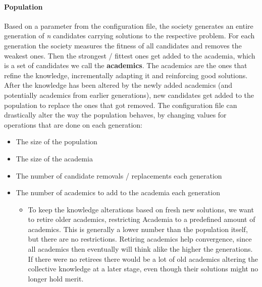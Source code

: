 \documentclass[a4paper,english]{report}
\begin{document}
		\paragraph{Population}
		Based on a parameter from the configuration file, the society generates an entire generation of \textit{n} candidates carrying solutions to the respective problem. For each generation the society measures the fitness of all candidates and removes the weakest ones. Then the strongest / fittest ones get added to the academia, which is a set of candidates we call the \textbf{academics}. The academics are the ones that refine the knowledge, incrementally adapting it and reinforcing good solutions. After the knowledge has been altered by the newly added academics (and potentially academics from earlier generations), new candidates get added to the population to replace the ones that got removed. The configuration file can drastically alter the way the population behaves, by changing values for operations that are done on each generation:
		\begin{itemize}
			\item The size of the population
			\item The size of the academia
			\item The number of candidate removals / replacements each generation
			\item The number of academics to add to the academia each generation
			   \begin{itemize}
				\item To keep the knowledge alterations based on fresh new solutions, we want to retire older academics, restricting Academia to a predefined amount of academics. This is generally a lower number than the population itself, but there are no restrictions. Retiring academics help convergence, since all academics then eventually will think alike the higher the generations. If there were no retirees there would be a lot of old academics altering the collective knowledge at a later stage, even though their solutions might no longer hold merit.
				\end{itemize}
		\end{itemize}
		\clearpage
\end{document}
